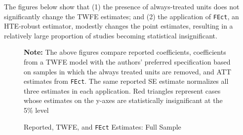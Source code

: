 \documentclass[12pt]{article}
\begin{document}
The figures below show that (1) the presence of always-treated units does not significantly change the TWFE estimates; and (2) the application of \texttt{FEct}, an HTE-robust estimator, modestly changes the point estimates, resulting in a relatively large proportion of studies becoming statistical insignificant. 

\begin{figure}[!ht]
\caption{Reported, TWFE, and \texttt{FEct} Estimates: Full Sample}\label{fg:compare_full}
\centering
\begin{minipage}{1\linewidth}{
\begin{center}
\hspace{2em}
\end{center}\vspace{-1em}
{\footnotesize\textbf{Note:} The above figures compare reported coefficients, coefficients from a TWFE model with the authors' preferred specification based on samples in which the always treated units are removed, and ATT estimates from \texttt{FEct}. The same reported SE estimate normalizes all three estimates in each application. Red triangles represent cases whose estimates on the y-axes are statistically insignificant at the 5\% level}}
\end{minipage}%
\end{figure}
\end{document}
